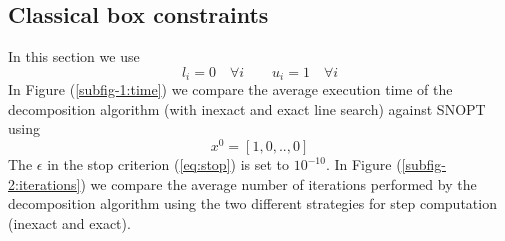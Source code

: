\subsection{Classical box constraints}
In this section we use 
\begin{equation}\label{eq:classicalbox}
l_i = 0 \quad \forall i \qquad u_i = 1  \quad \forall i
\end{equation} 
In Figure (\ref{subfig-1:time}) we compare the average execution time of the decomposition algorithm (with inexact and exact line search) against SNOPT using 
\begin{equation}
x^0 = [1, 0, .., 0]
\end{equation}
The $\epsilon$ in the stop criterion (\ref{eq:stop}) is set to $10^{-10}$. In Figure (\ref{subfig-2:iterations}) we compare the average number of iterations performed by the decomposition algorithm using the two different strategies for step computation (inexact and exact).
